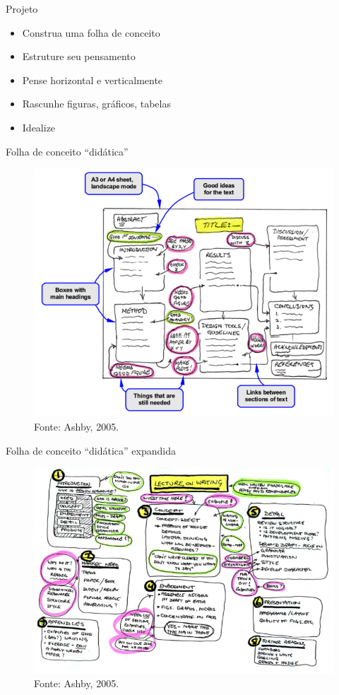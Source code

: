 \begin{frame}{Projeto}
\begin{itemize}
\item Construa uma folha de conceito
\item Estruture seu pensamento 
\item Pense horizontal e verticalmente
\item Rascunhe figuras, gráficos, tabelas 
\item Idealize
\end{itemize}
\end{frame}


\begin{frame}{Folha de conceito ``didática''}
\begin{figure}
\centering
\includegraphics[scale=0.3]{figs/05/concept1}
\caption{Fonte: Ashby, 2005.}
\end{figure}
\end{frame}


\begin{frame}{Folha de conceito ``didática'' expandida}
\begin{figure}
\centering
\includegraphics[scale=0.32]{figs/05/concept2}
\caption{Fonte: Ashby, 2005.}
\end{figure}
\end{frame}


